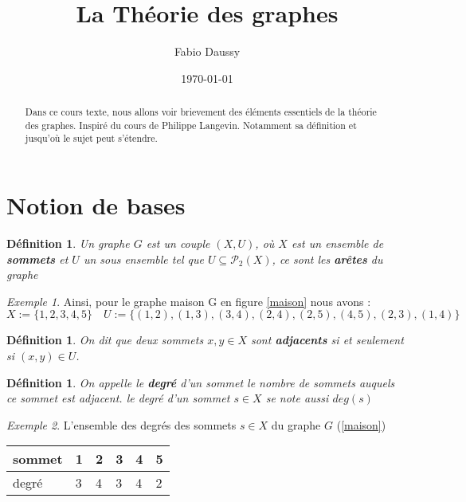 \documentclass[12pt,a4paper]{scrartcl}
\title{La Théorie des graphes}
\author{Fabio Daussy}
\date{\today}
\theoremstyle{plain}
\newtheorem{definition}[theoreme]{Définition}
\theoremstyle{remark}
\newtheorem*{exemple}{Exemple}
\begin{document}
\maketitle

\begin{abstract}
Dans ce cours texte, nous allons voir brievement des éléments essentiels de la théorie des graphes. Inspiré du cours de Philippe Langevin.
Notamment sa définition et jusqu'où le sujet peut s'étendre.
\end{abstract}

\tableofcontents


\section{Notion de bases}

\begin{definition}
Un graphe $G$ est un couple $(X,U)$, où $X$ est un ensemble de \textbf{sommets} et
$U$ un sous ensemble tel que $U \subseteq \mathcal{P}_2(X)$, ce sont les \textbf{arêtes} du graphe 
\end{definition}

\begin{exemple}
	Ainsi, pour le graphe maison G en figure \ref{maison} nous avons :
$X:= \{ 1,2,3,4,5 \}\quad
U:= \{ (1,2),(1,3),(3,4),(2,4),(2,5),(4,5),(2,3),(1,4) \}$	
\end{exemple}

\begin{definition}
	On dit que deux sommets $x,y \in X$ sont \textbf{adjacents} si et seulement si $(x,y) \in U$.
\end{definition}

\begin{definition}
	On appelle le \textbf{degré} d'un sommet le nombre de sommets auquels ce sommet est adjacent. le degré d'un sommet $s \in X$ se note aussi $deg(s)$
\end{definition}

\begin{exemple}
	L'ensemble des degrés des sommets $s \in X$ du graphe $G$ (\ref{maison})
	\begin{table}[]
	\begin{tabular}{|l|l|l|l|l|l|}
	\hline
	sommet & 1 & 2 & 3 & 4 & 5 \\
	\hline
	degré  & 3 & 4 & 3 & 4 & 2 \\
	\hline
	\end{tabular}
	\end{table}
\end{exemple}
\end{document}
